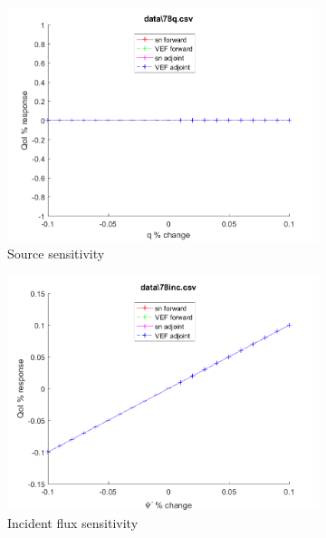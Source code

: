 \documentclass{article}
\begin{document}
\begin{figure}[H]
\label{Case78Sens}
\centering
\begin{subfigure}{.5\textwidth}
  \centering
  \includegraphics[width=.98\linewidth]{IanProposal/figures2/78qSens.png}
  \caption{Source sensitivity}
  \label{fig:sfig1}
\end{subfigure}%
\begin{subfigure}{.5\textwidth}
  \centering
  \includegraphics[width=.98\linewidth]{IanProposal/figures2/78incSens.png}
  \caption{Incident flux sensitivity}
  \label{fig:sfig4}
\end{subfigure}%
\\
\begin{subfigure}{.5\textwidth}
  \centering

\end{subfigure}
\end{figure}
\end{document}
